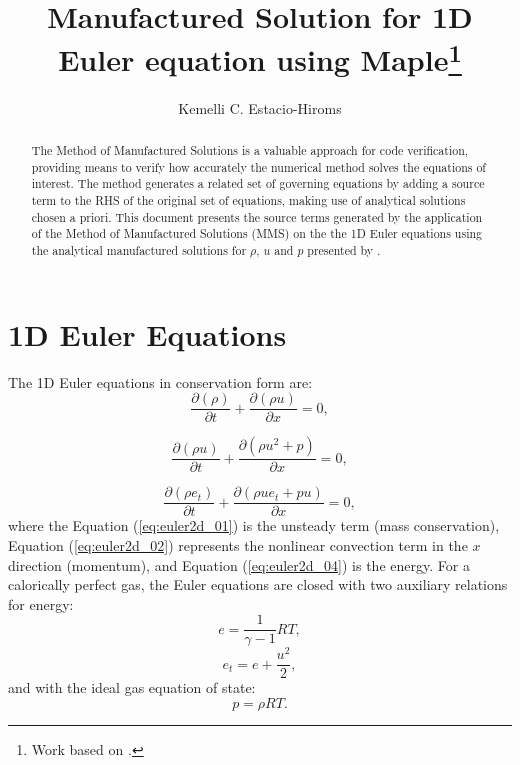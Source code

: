 \documentclass[10pt]{article}
\title{Manufactured Solution for 1D Euler equation using Maple\footnote{Work based on \citet*{Roy2002}.}}
\author{Kemelli C. Estacio-Hiroms}
\newcommand{\Diff}[2] {\dfrac{\partial( #1)}{\partial #2}}
\begin{document}
\maketitle

\begin{abstract}
The Method of Manufactured Solutions is a valuable approach for code verification, providing means to verify how accurately the numerical method solves the equations of interest. The method generates a related set of governing equations by adding a source term to the RHS of the original set of equations, making use of analytical solutions chosen a priori. 
This document presents the source terms generated by the application of the Method of Manufactured Solutions (MMS) on the the 1D Euler equations using the analytical manufactured solutions for $\rho,\, u$ and $p$ presented by \citet{Roy2002}.
\end{abstract}





\section{1D Euler Equations}
The 1D Euler equations in conservation form are:
\begin{equation}
 \label{eq:euler2d_01}
\Diff{\rho}{t} + \Diff{\rho u}{x} = 0,
\end{equation}


\begin{equation}
 \label{eq:euler2d_02}
\Diff{\rho u}{t} + \Diff{\rho u^2 + p}{x} = 0,
\end{equation}




\begin{equation}
 \label{eq:euler2d_04}
\Diff{\rho e_t}{t} + \Diff{\rho ue_t +pu}{x} = 0,
\end{equation}
%
where the Equation (\ref{eq:euler2d_01}) is the unsteady term (mass conservation), Equation (\ref{eq:euler2d_02}) represents the nonlinear convection term in the $x$  direction (momentum), and Equation (\ref{eq:euler2d_04}) is the energy. For a calorically perfect gas, the Euler equations are closed with two auxiliary relations for energy:
\begin{equation}
 \label{eq:euler2d_05}
e=\dfrac{1}{\gamma -1}RT ,
\end{equation}
%
\begin{equation}
 \label{eq:euler2d_06}
e_t= e+\dfrac{u^2}{2},
\end{equation}
and with the ideal gas equation of state:
\begin{equation}
 \label{eq:euler2d_07}
p=\rho RT.
\end{equation}
\end{document}
